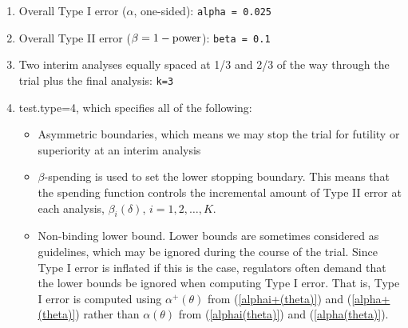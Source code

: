 \begin{enumerate}
\item Overall Type I error ($\alpha$, one-sided): \texttt{alpha = 0.025}

\item Overall Type II error ($\beta=1-\hbox{power}$): \texttt{beta = 0.1}

\item Two interim analyses equally spaced at 1/3 and 2/3 of the way through the trial plus the final analysis:  \texttt{k=3}

\item {test.type=4}, which specifies all of the following:
\begin{itemize}
\item Asymmetric boundaries, which means we may stop the trial for futility or
superiority at an interim analysis
\item $\beta$-spending is used to set the lower stopping
boundary. This means that the spending function controls the incremental
amount of Type II error at each analysis, $\beta_i(\delta)$, $i=1,2,\ldots,K$.
\item Non-binding lower bound. Lower bounds are sometimes considered as
guidelines, which may be ignored during the course of the trial. 
Since Type I error is inflated if this is the case, regulators often demand that the lower bounds be ignored when computing Type I error.
That is, Type I error is computed using $\alpha^+(\theta)$ from (\ref{alphai+(theta)}) and (\ref{alpha+(theta)}) rather than $\alpha(\theta)$ from (\ref{alphai(theta)}) and (\ref{alpha(theta)}). 
\end{itemize}


\end{enumerate}
